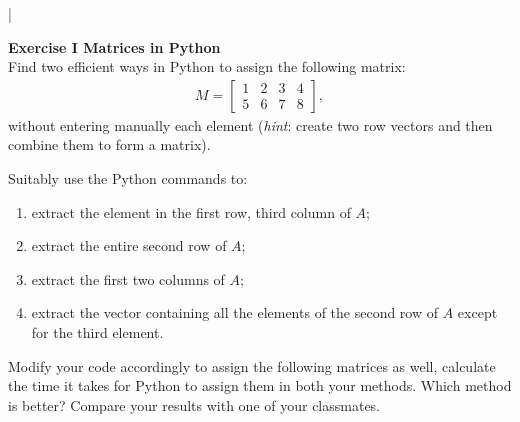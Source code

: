 \documentclass[11pt]{article}
\begin{document}
\lstset{frameround=fttt,language=Matlab}

\lstMakeShortInline[columns=fixed]|



{\bf{Exercise I Matrices in Python}}\\

Find two efficient ways in Python to assign the following matrix:
\begin{align*}
M = \begin{bmatrix}
    1 & 2 & 3 & 4 \\
    5 & 6 & 7 & 8
\end{bmatrix},
\end{align*}
without entering manually each element (\textit{hint}: create two row vectors and then combine them to form a matrix). 

Suitably use the Python commands to:
\begin{enumerate}
\item extract the element in the first row, third column of $A$;
\item extract the entire second row of $A$;
\item extract the first two columns of $A$;
\item extract the vector containing all the elements of the second row of $A$ except for the third element.
\end{enumerate}

Modify your code accordingly to assign the following matrices as well, calculate the time it takes for Python to assign them in both your methods. Which method is better? Compare your results with one of your classmates.
\end{document}
